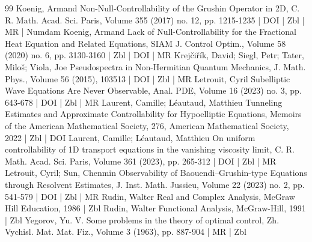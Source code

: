 \documentclass[10pt]{amsart}
\theoremstyle{definition}\newtheorem{defi}[theo]{Definition}\newtheorem{rema}[theo]{Remark}\newtheorem{exam}[theo]{Example}\newtheorem{exem}[theo]{Example}\newtheorem{nota}[theo]{Notation}
\newcommand{\1}{\mathds 1}
\begin{document}
\begin{thebibliography}{99}
Koenig, Armand Non-Null-Controllability of the Grushin Operator in 2D, C. R. Math. Acad. Sci. Paris, Volume 355 (2017) no. 12, pp. 1215-1235 | DOI | Zbl | MR | Numdam
Koenig, Armand Lack of Null-Controllability for the Fractional Heat Equation and Related Equations, SIAM J. Control Optim., Volume 58 (2020) no. 6, pp. 3130-3160 | Zbl | DOI | MR
Krejčiřík, David; Siegl, Petr; Tater, Miloš; Viola, Joe Pseudospectra in Non-Hermitian Quantum Mechanics, J. Math. Phys., Volume 56 (2015), 103513 | DOI | Zbl | MR
Letrouit, Cyril Subelliptic Wave Equations Are Never Observable, Anal. PDE, Volume 16 (2023) no. 3, pp. 643-678 | DOI | Zbl | MR
Laurent, Camille; Léautaud, Matthieu Tunneling Estimates and Approximate Controllability for Hypoelliptic Equations, Memoirs of the American Mathematical Society, 276, American Mathematical Society, 2022 | Zbl | DOI
Laurent, Camille; Léautaud, Matthieu On uniform controllability of 1D transport equations in the vanishing viscosity limit, C. R. Math. Acad. Sci. Paris, Volume 361 (2023), pp. 265-312 | DOI | Zbl | MR
Letrouit, Cyril; Sun, Chenmin Observability of Baouendi–Grushin-type Equations through Resolvent Estimates, J. Inst. Math. Jussieu, Volume 22 (2023) no. 2, pp. 541-579 | DOI | Zbl | MR
Rudin, Walter Real and Complex Analysis, McGraw Hill Education, 1986 | Zbl
Rudin, Walter Functional Analysis, McGraw-Hill, 1991 | Zbl
Yegorov, Yu. V. Some problems in the theory of optimal control, Zh. Vychisl. Mat. Mat. Fiz., Volume 3 (1963), pp. 887-904 | MR | Zbl
\end{thebibliography}
\end{document}
